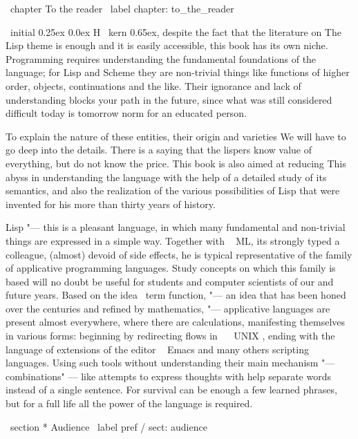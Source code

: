\ chapter {To the reader} \ label {chapter: to_the_reader}

\ initial {0.25ex} {0.0ex} {H} { \ kern 0.65ex, despite the fact that} the literature on
The Lisp theme is enough and it is easily accessible, this book has its own niche.
Programming requires understanding the fundamental foundations of the language; for Lisp and
Scheme they are non-trivial things like functions of higher order, objects,
continuations and the like. Their ignorance and lack of understanding blocks your path
in the future, since what was still considered difficult today is tomorrow
norm for an educated person.

To explain the nature of these entities, their origin and varieties
We will have to go deep into the details. There is a saying that the lispers know
value of everything, but do not know the price. This book is also aimed at reducing
This abyss in understanding the language with the help of a detailed study of its semantics,
and also the realization of the various possibilities of Lisp that were invented for his
more than thirty years of history.

Lisp "--- this is a pleasant language, in which many fundamental and non-trivial
things are expressed in a simple way. Together with ~ ML, its strongly typed
a colleague, (almost) devoid of side effects, he is typical
representative of the family of applicative programming languages. Study
concepts on which this family is based will no doubt be useful for
students and computer scientists of our and future years. Based on the idea
\ term {function}, "--- an idea that has been honed over the centuries and refined by mathematics,
"--- applicative languages ​​are present almost everywhere, where there are
calculations, manifesting themselves in various forms: beginning by redirecting flows
in ~ \ UNIX , ending with the language of extensions of the editor ~ Emacs and many others
scripting languages. Using such tools without understanding their main
mechanism "--- combinations" --- like attempts to express thoughts with help
separate words instead of a single sentence. For survival can be enough
a few learned phrases, but for a full life all the power of the language is required.


\ section * {Audience} \ label {pref / sect: audience}

